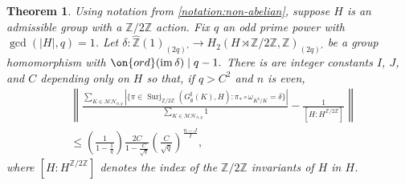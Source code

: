\documentclass[12 pt]{amsart}
\theoremstyle{plain}
\newtheorem{theorem}[subsubsection]{Theorem}
\theoremstyle{definition}
\theoremstyle{remark}
\numberwithin{equation}{section}
\DeclareMathOperator\im{im}
\DeclareMathOperator\surj{Surj}
\begin{document}
\begin{theorem}
	\label{theorem:non-abelian-moments-with-error}
	Using notation from \autoref{notation:non-abelian},
	suppose $H$ is an admissible group with a $\mathbb Z/2 \mathbb Z$ action.
	Fix $q$ an odd prime power with 
	$\gcd( |H|, q) = 1$.
Let $\delta: \hat{\mathbb Z}(1)_{(2q)'} \to H_2(H \rtimes \mathbb Z/2 \mathbb Z, \mathbb
Z)_{(2q)'}$ be a group homomorphism with $\on{ord}(\im \delta) \mid q-1.$
	There is are integer constants $I$, $J$, and $C$ depending only on $H$ so that,
	if $q > C^2$ and $n$ is even,
		\begin{equation}
	\begin{aligned}
		\label{equation:non-abelian-cl}
		&\left \|  \frac{\sum_{K \in \mathcal{MH}_{n,q}}
			\left| \{ \pi \in \surj_{\mathbb Z/2 \mathbb
			Z}\left(G^\sharp_\emptyset(K), H \right): \pi_* \circ
	\omega_{K^\sharp/K} = \delta \}\right|} {\sum_{K \in \mathcal{MH}_{n,q}} 1} -
	\frac{1}{[H: H^{\mathbb Z/2 \mathbb Z}]} \right \| \\
	&\leq 
		\left(\frac{1}{1-\frac{1}{q}} \right)
		\frac{2C}{1- \frac{C}{\sqrt{q}}}
		\left(\frac{C}{\sqrt{q}}\right)^{\frac{n-J}{I}},
	\end{aligned}
	\end{equation}
where $[H: H^{\mathbb Z/2 \mathbb Z}]$ denotes the index of the $\mathbb Z/2
\mathbb Z$ invariants of $H$ in $H$.
\end{theorem}
\end{document}
